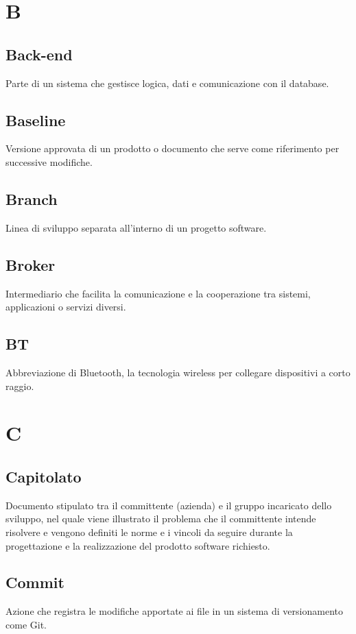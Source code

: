 \documentclass[a4paper,12pt]{article}
\begin{document}
      
\newpage
        \section{B}
        
          \subsection*{Back-end}
			Parte di un sistema che gestisce logica, dati e comunicazione con il database.
          \subsection*{Baseline}
			Versione approvata di un prodotto o documento che serve come riferimento per successive modifiche.
          \subsection*{Branch}
			Linea di sviluppo separata all'interno di un progetto software.
          \subsection*{Broker}
			Intermediario che facilita la comunicazione e la cooperazione tra sistemi, applicazioni o servizi diversi.
          \subsection*{BT}
			Abbreviazione di Bluetooth, la tecnologia wireless per collegare dispositivi a corto raggio.
        
      

      
\newpage      
        \section{C}
        
          \subsection*{Capitolato}
			Documento stipulato tra il committente (azienda) e il gruppo incaricato dello sviluppo, nel quale viene illustrato il problema che il committente intende risolvere e vengono definiti le norme e i vincoli da seguire durante la progettazione e la realizzazione del prodotto software richiesto. 
          \subsection*{Commit}
			Azione che registra le modifiche apportate ai file in un sistema di versionamento come Git.
\end{document}
